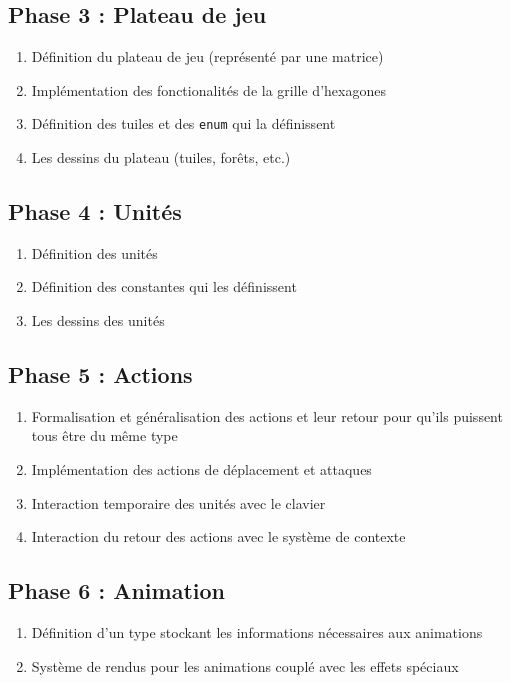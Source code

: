 \documentclass{article}
\begin{document}
\subsection*{Phase 3 : Plateau de jeu}
\begin{enumerate}
    \item Définition du plateau de jeu (représenté par une matrice)
    \item Implémentation des fonctionalités de la grille d'hexagones
    \item Définition des tuiles et des \texttt{enum} qui la définissent
    \item Les dessins du plateau (tuiles, forêts, etc.)
\end{enumerate}

\subsection*{Phase 4 : Unités}
\begin{enumerate}
    \item Définition des unités
    \item Définition des constantes qui les définissent
    \item Les dessins des unités
\end{enumerate}

\subsection*{Phase 5 : Actions}
\begin{enumerate}
    \item Formalisation et généralisation des actions et leur retour pour qu'ils puissent tous être du même type
    \item Implémentation des actions de déplacement et attaques
    \item Interaction temporaire des unités avec le clavier
    \item Interaction du retour des actions avec le système de contexte
\end{enumerate}


\subsection*{Phase 6 : Animation}
\begin{enumerate}
    \item Définition d'un type stockant les informations nécessaires aux animations
    \item Système de rendus pour les animations couplé avec les effets spéciaux
\end{enumerate}
\end{document}
